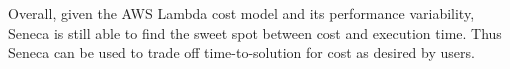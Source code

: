 Overall, given the AWS Lambda cost model and its performance variability, 
Seneca is still able to find the sweet spot between cost 
and execution time. Thus Seneca can be used to trade off time-to-solution for
cost as desired by users.


%



